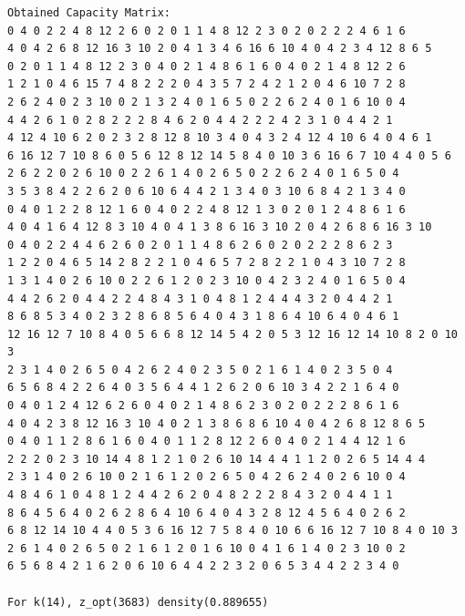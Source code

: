 \documentclass[11pt]{article}
\begin{document}
\begin{lstlisting}
Obtained Capacity Matrix:
0 4 0 2 2 4 8 12 2 6 0 2 0 1 1 4 8 12 2 3 0 2 0 2 2 2 4 6 1 6
4 0 4 2 6 8 12 16 3 10 2 0 4 1 3 4 6 16 6 10 4 0 4 2 3 4 12 8 6 5
0 2 0 1 1 4 8 12 2 3 0 4 0 2 1 4 8 6 1 6 0 4 0 2 1 4 8 12 2 6
1 2 1 0 4 6 15 7 4 8 2 2 2 0 4 3 5 7 2 4 2 1 2 0 4 6 10 7 2 8
2 6 2 4 0 2 3 10 0 2 1 3 2 4 0 1 6 5 0 2 2 6 2 4 0 1 6 10 0 4
4 4 2 6 1 0 2 8 2 2 2 8 4 6 2 0 4 4 2 2 2 4 2 3 1 0 4 4 2 1
4 12 4 10 6 2 0 2 3 2 8 12 8 10 3 4 0 4 3 2 4 12 4 10 6 4 0 4 6 1
6 16 12 7 10 8 6 0 5 6 12 8 12 14 5 8 4 0 10 3 6 16 6 7 10 4 4 0 5 6
2 6 2 2 0 2 6 10 0 2 2 6 1 4 0 2 6 5 0 2 2 6 2 4 0 1 6 5 0 4
3 5 3 8 4 2 2 6 2 0 6 10 6 4 4 2 1 3 4 0 3 10 6 8 4 2 1 3 4 0
0 4 0 1 2 2 8 12 1 6 0 4 0 2 2 4 8 12 1 3 0 2 0 1 2 4 8 6 1 6
4 0 4 1 6 4 12 8 3 10 4 0 4 1 3 8 6 16 3 10 2 0 4 2 6 8 6 16 3 10
0 4 0 2 2 4 4 6 2 6 0 2 0 1 1 4 8 6 2 6 0 2 0 2 2 2 8 6 2 3
1 2 2 0 4 6 5 14 2 8 2 2 1 0 4 6 5 7 2 8 2 2 1 0 4 3 10 7 2 8
1 3 1 4 0 2 6 10 0 2 2 6 1 2 0 2 3 10 0 4 2 3 2 4 0 1 6 5 0 4
4 4 2 6 2 0 4 4 2 2 4 8 4 3 1 0 4 8 1 2 4 4 4 3 2 0 4 4 2 1
8 6 8 5 3 4 0 2 3 2 8 6 8 5 6 4 0 4 3 1 8 6 4 10 6 4 0 4 6 1
12 16 12 7 10 8 4 0 5 6 6 8 12 14 5 4 2 0 5 3 12 16 12 14 10 8 2 0 10 3
2 3 1 4 0 2 6 5 0 4 2 6 2 4 0 2 3 5 0 2 1 6 1 4 0 2 3 5 0 4
6 5 6 8 4 2 2 6 4 0 3 5 6 4 4 1 2 6 2 0 6 10 3 4 2 2 1 6 4 0
0 4 0 1 2 4 12 6 2 6 0 4 0 2 1 4 8 6 2 3 0 2 0 2 2 2 8 6 1 6
4 0 4 2 3 8 12 16 3 10 4 0 2 1 3 8 6 8 6 10 4 0 4 2 6 8 12 8 6 5
0 4 0 1 1 2 8 6 1 6 0 4 0 1 1 2 8 12 2 6 0 4 0 2 1 4 4 12 1 6
2 2 2 0 2 3 10 14 4 8 1 2 1 0 2 6 10 14 4 4 1 1 2 0 2 6 5 14 4 4
2 3 1 4 0 2 6 10 0 2 1 6 1 2 0 2 6 5 0 4 2 6 2 4 0 2 6 10 0 4
4 8 4 6 1 0 4 8 1 2 4 4 2 6 2 0 4 8 2 2 2 8 4 3 2 0 4 4 1 1
8 6 4 5 6 4 0 2 6 2 8 6 4 10 6 4 0 4 3 2 8 12 4 5 6 4 0 2 6 2
6 8 12 14 10 4 4 0 5 3 6 16 12 7 5 8 4 0 10 6 6 16 12 7 10 8 4 0 10 3
2 6 1 4 0 2 6 5 0 2 1 6 1 2 0 1 6 10 0 4 1 6 1 4 0 2 3 10 0 2
6 5 6 8 4 2 1 6 2 0 6 10 6 4 4 2 2 3 2 0 6 5 3 4 4 2 2 3 4 0

For k(14), z_opt(3683) density(0.889655)


\end{lstlisting}
\end{document}
